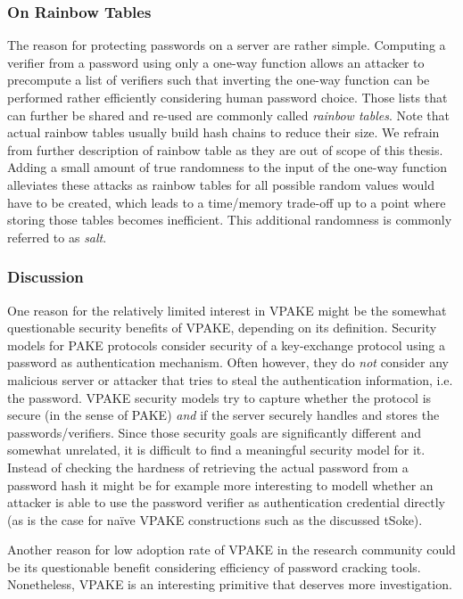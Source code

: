 \subsubsection{On Rainbow Tables}
The reason for protecting passwords on a server are rather simple.
Computing a verifier from a password using only a one-way function allows an attacker to precompute a list of verifiers such that inverting the one-way function can be performed rather efficiently considering human password choice.
Those lists that can further be shared and re-used are commonly called \emph{rainbow tables}.
Note that actual rainbow tables usually build hash chains to reduce their size.
We refrain from further description of rainbow table as they are out of scope of this thesis.
Adding a small amount of true randomness to the input of the one-way function alleviates these attacks as rainbow tables for all possible random values would have to be created, which leads to a time/memory trade-off up to a point where storing those tables becomes inefficient.
This additional randomness is commonly referred to as \emph{salt}.

\subsubsection{Discussion}\label{sec:intro:vpake-discusion}
One reason for the relatively limited interest in \acl{VPAKE} might be the somewhat questionable security benefits of \ac{VPAKE}, depending on its definition.
Security models for \ac{PAKE} protocols consider security of a key-exchange protocol using a password as authentication mechanism.
Often however, they do \emph{not} consider any malicious server or attacker that tries to steal the authentication information, i.e. the password.
\ac{VPAKE} security models try to capture whether the protocol is secure (in the sense of \acl{PAKE}) \emph{and} if the server securely handles and stores the passwords/verifiers.
Since those security goals are significantly different and somewhat unrelated, it is difficult to find a meaningful security model for it.
Instead of checking the hardness of retrieving the actual password from a password hash it might be for example more interesting to modell whether an attacker is able to use the password verifier as authentication credential directly (as is the case for na{\"i}ve \ac{VPAKE} constructions such as the discussed tSoke).

Another reason for low adoption rate of \ac{VPAKE} in the research community could be its questionable benefit considering efficiency of password cracking tools.
Nonetheless, \ac{VPAKE} is an interesting primitive that deserves more investigation.


